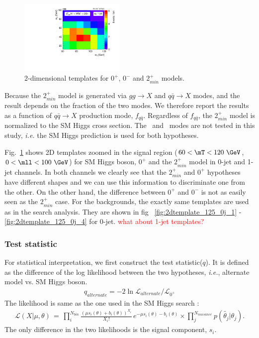 \begin{figure}[ht!]
\includegraphics[width=0.45\textwidth]{figures/2d_prefit_1j_125_spin2_paper.pdf}
\caption{2-dimensional templates for $0^+$, $0^-$ and $2_{min}^+$ models.} 
\label{fig:2dtemplates_spin} 
\end{figure} 

Because the $2_{min}^+$ model is generated via $gg\rightarrow X$ and $q\bar{q }\rightarrow X$
modes, and the result depends on the fraction of the two modes. 
We therefore report the results as a function of $q\bar{q} \rightarrow X$ production mode, 
$f_{q\bar{q}}$. Regardless of $f_{q\bar{q}}$, the $2_{min}^+$ model is normalized to the 
SM Higgs cross section. The \qqH\ and \qqVH\ modes are not tested in this study, 
\textit{i.e.} the SM Higgs prediction is used for both hypotheses. 

Fig.~\ref{fig:2dtemplates_spin} shows 2D templates zoomed in the signal region
($60<\mT<120~\GeV$, $0<\mll<100~\GeV$)
for SM Higgs boson, $0^+$  and the $2_{min}^+$ model in 0-jet and 1-jet channels. 
In both channels we clearly see that the $2_{min}^+$ and $0^+$ hypotheses have different shapes 
and we can use this information to discriminate one from the other.
On the other hand, the difference between $0^+$ and $0^-$ 
is not as easily seen as the $2_{min}^+$ case. 
For the backgrounds, the exactly same templates are used as in the 
search analysis. They are shown in fig ~\ref{fig:2dtemplate_125_0j_1}
- \ref{fig:2dtemplate_125_0j_4} for 0-jet. 
\textcolor{red}{what about 1-jet templates?} 

\subsubsection{Test statistic}

For statistical interpretation, we first construct the test statistic($q$). 
It is defined as the difference of the log likelihood between the two 
hypotheses, \textit{i.e.}, alternate model vs. SM Higgs boson. 
\begin{eqnarray} 
q_{alternate} = -2 \ln \mathcal{L}_{alternate} / \mathcal{L}_{0^+}  
\end{eqnarray} 
The likelihood is same as the one used in the SM Higgs search :  
\begin{eqnarray} 
\mathcal{L} ( X | \mu, \theta) 
\, = \,
\prod_{i}^{N_{bin}} \frac{ \left( \mu s_i(\theta) + b_i(\theta) \right)^{X_i}}{X_i!} 
\, e^{ - \mu s_i(\theta) - b_i(\theta) }   \times
\prod_{j}^{N_{nuisance}} p\left( \tilde{\theta_j} | \theta_j \right).
\end{eqnarray}
The only difference in the two likelihoods is the signal component, $s_i$.

